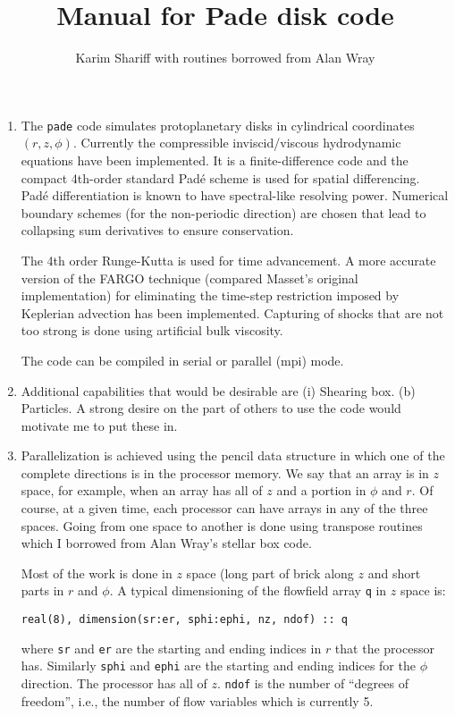 \documentclass[11pt]{amsart}
\title{Manual for Pade disk code}
\author{Karim Shariff with routines borrowed from Alan Wray}
\begin{document}
\maketitle

\begin{enumerate}
\item The {\tt pade} code simulates protoplanetary disks in cylindrical coordinates
$(r, z, \phi)$.  Currently the compressible inviscid/viscous hydrodynamic equations have been implemented.
It is a finite-difference code and the compact 4th-order standard Pad\'e scheme is used for spatial differencing.  
Pad\'e differentiation is known to have spectral-like resolving power.
Numerical boundary schemes (for the non-periodic direction) are chosen that lead to collapsing sum derivatives to ensure conservation.

The 4th order Runge-Kutta is
used for time advancement.  
A more accurate version of the FARGO technique (compared Masset's original implementation) for eliminating the time-step restriction imposed by Keplerian advection has been implemented.  Capturing of shocks that are not too strong is done using artificial bulk viscosity.

The code can be compiled in serial or parallel (mpi) mode.

\item Additional capabilities that would be desirable are (i) Shearing box. (b) Particles.  A strong desire on the part of others to use the code would motivate me to put these in.

\item
Parallelization is achieved using the pencil data structure in which one of the complete directions
is in the processor memory.  We say that an array is in $z$ space, for example, when an array has all of $z$ and a portion in $\phi$ and $r$.  Of course, at a given time, each processor can have arrays in any of the three spaces.  Going from one space to another is done using transpose routines which I borrowed from Alan Wray's stellar box code.

Most of the work is done in $z$ space (long part of brick along $z$ and short parts in $r$ and $\phi$.  A typical dimensioning of the flowfield array {\tt q} in $z$ space is:
\begin{verbatim}
real(8), dimension(sr:er, sphi:ephi, nz, ndof) :: q
\end{verbatim}
where {\tt sr} and {\tt er} are the starting and ending indices in $r$ that the processor has.  Similarly {\tt sphi} and {\tt ephi} are the starting and ending indices for the $\phi$ direction.  The processor has all of $z$.  {\tt ndof} is the number of ``degrees of freedom'', i.e., the number of flow variables which is currently 5.




\end{enumerate}
\end{document}
